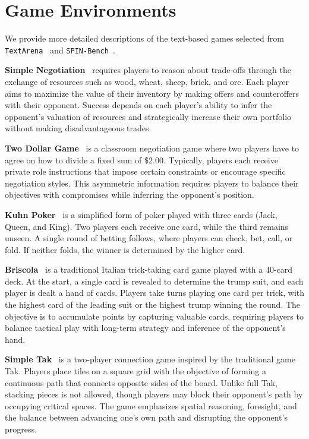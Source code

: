 
\vspace{0.7pt}

\vspace{0.7pt}


\section{Game Environments}
\label{app:game_env}
We provide more detailed descriptions of the text-based games selected from \texttt{TextArena}~\citep{guertler2025textarena} and \texttt{SPIN-Bench}~\citep{yao2025spin}.

\medskip
\textbf{Simple Negotiation}~\citep{Nash1950THEBP} requires players to reason about trade-offs through the exchange of resources such as wood, wheat, sheep, brick, and ore. Each player aims to maximize the value of their inventory by making offers and counteroffers with their opponent. Success depends on each player's ability to infer the opponent’s valuation of resources and strategically increase their own portfolio without making disadvantageous trades.

\textbf{Two Dollar Game}~\citep{MIT_OCW_Negotiation2001} is a classroom negotiation game where two players have to agree on how to divide a fixed sum of \$2.00. Typically, players each receive private role instructions that impose certain constraints or encourage specific negotiation styles. This asymmetric information requires players to balance their objectives with compromises while inferring the opponent's position.

\textbf{Kuhn Poker}~\citep{Kuhn1951} is a simplified form of poker played with three cards (Jack, Queen, and King). Two players each receive one card, while the third remains unseen. A single round of betting follows, where players can check, bet, call, or fold. If neither folds, the winner is determined by the higher card.

\textbf{Briscola}~\citep{pagat_briscola} is a traditional Italian trick-taking card game played with a 40-card deck. At the start, a single card is revealed to determine the trump suit, and each player is dealt a hand of cards. Players take turns playing one card per trick, with the highest card of the leading suit or the highest trump winning the round. The objective is to accumulate points by capturing valuable cards, requiring players to balance tactical play with long-term strategy and inference of the opponent’s hand.

\textbf{Simple Tak}~\citep{Rothfuss2011} is a two-player connection game inspired by the traditional game Tak. Players place tiles on a square grid with the objective of forming a continuous path that connects opposite sides of the board. Unlike full Tak, stacking pieces is not allowed, though players may block their opponent’s path by occupying critical spaces. The game emphasizes spatial reasoning, foresight, and the balance between advancing one’s own path and disrupting the opponent’s progress.


